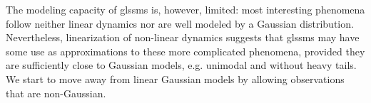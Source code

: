 The modeling capacity of \glspl{glssm} is, however, limited: most interesting phenomena follow neither linear dynamics nor are well modeled by a Gaussian distribution.
Nevertheless, linearization of non-linear dynamics suggests that  \gls{glssm}s may have some use as approximations to these more complicated phenomena, provided they are sufficiently close to Gaussian models, e.g. unimodal and without heavy tails.
We start to move away from linear Gaussian models by allowing observations that are non-Gaussian.
